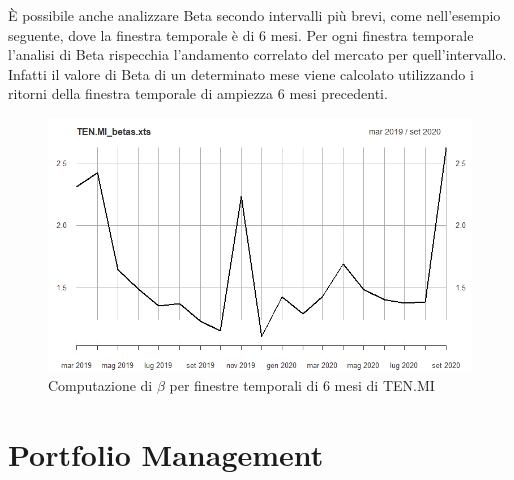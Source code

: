 \documentclass[12pt]{article}
\begin{document}
È possibile anche analizzare Beta secondo intervalli più brevi, come nell'esempio seguente, dove la finestra temporale è di 6 mesi. Per ogni finestra temporale l'analisi di Beta rispecchia l'andamento correlato del mercato per quell'intervallo. Infatti il valore di Beta di un determinato mese viene calcolato utilizzando i ritorni della finestra temporale di ampiezza 6 mesi precedenti.
\begin{figure}[!htb]
    \centering
    \includegraphics[width=1\textwidth]{immagini/betaTenMIfinestratotale.png}
    \caption{Computazione di $\beta$ per finestre temporali di 6 mesi di TEN.MI}
\end{figure}
\FloatBarrier


\newpage
\section{Portfolio Management}
\newpage
\end{document}
